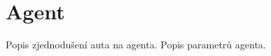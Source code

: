 \section{Agent}\label{sec:agent}

Popis zjednodušení auta na agenta.
Popis parametrů agenta.

%
%
%
%
%

